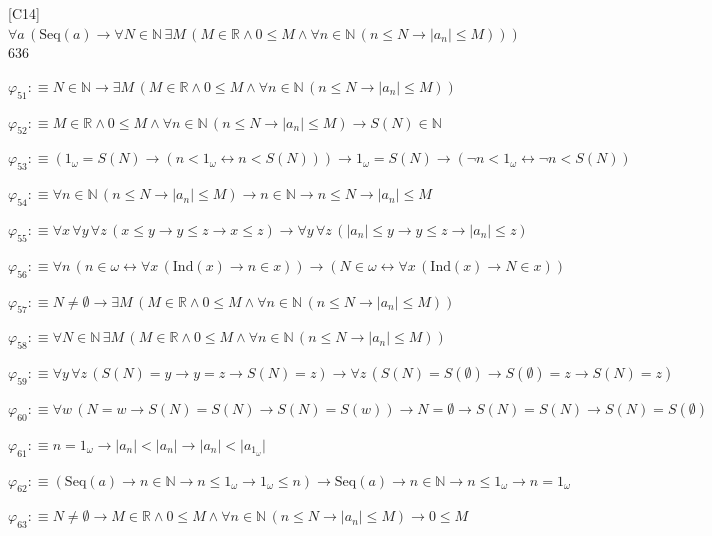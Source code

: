 \begin{fullproof}{[C14]}{$\forall a\,(\mathrm{Seq}(a) \to \forall N \in \mathbb{N}\,\exists M\,(M \in \mathbb{R} \land 0 \leq M \land \forall n \in \mathbb{N}\,(n \leq N \to \lvert a_{n} \rvert \leq M)))$}{636}
\begin{abbrevlist}
\item $\varphi_{51} :\equiv N \in \mathbb{N} \to \exists M\,(M \in \mathbb{R} \land 0 \leq M \land \forall n \in \mathbb{N}\,(n \leq N \to \lvert a_{n} \rvert \leq M))$
\item $\varphi_{52} :\equiv M \in \mathbb{R} \land 0 \leq M \land \forall n \in \mathbb{N}\,(n \leq N \to \lvert a_{n} \rvert \leq M) \to S(N) \in \mathbb{N}$
\item $\varphi_{53} :\equiv (1_{\omega} = S(N) \to (n < 1_{\omega} \leftrightarrow n < S(N))) \to 1_{\omega} = S(N) \to (\neg n < 1_{\omega} \leftrightarrow \neg n < S(N))$
\item $\varphi_{54} :\equiv \forall n \in \mathbb{N}\,(n \leq N \to \lvert a_{n} \rvert \leq M) \to n \in \mathbb{N} \to n \leq N \to \lvert a_{n} \rvert \leq M$
\item $\varphi_{55} :\equiv \forall x\,\forall y\,\forall z\,(x \leq y \to y \leq z \to x \leq z) \to \forall y\,\forall z\,(\lvert a_{n} \rvert \leq y \to y \leq z \to \lvert a_{n} \rvert \leq z)$
\item $\varphi_{56} :\equiv \forall n\,(n \in \omega \leftrightarrow \forall x\,(\mathrm{Ind}(x) \to n \in x)) \to (N \in \omega \leftrightarrow \forall x\,(\mathrm{Ind}(x) \to N \in x))$
\item $\varphi_{57} :\equiv N \neq \emptyset \to \exists M\,(M \in \mathbb{R} \land 0 \leq M \land \forall n \in \mathbb{N}\,(n \leq N \to \lvert a_{n} \rvert \leq M))$
\item $\varphi_{58} :\equiv \forall N \in \mathbb{N}\,\exists M\,(M \in \mathbb{R} \land 0 \leq M \land \forall n \in \mathbb{N}\,(n \leq N \to \lvert a_{n} \rvert \leq M))$
\item $\varphi_{59} :\equiv \forall y\,\forall z\,(S(N) = y \to y = z \to S(N) = z) \to \forall z\,(S(N) = S(\emptyset) \to S(\emptyset) = z \to S(N) = z)$
\item $\varphi_{60} :\equiv \forall w\,(N = w \to S(N) = S(N) \to S(N) = S(w)) \to N = \emptyset \to S(N) = S(N) \to S(N) = S(\emptyset)$
\item $\varphi_{61} :\equiv n = 1_{\omega} \to \lvert a_{n} \rvert < \lvert a_{n} \rvert \to \lvert a_{n} \rvert < \lvert a_{1_{\omega}} \rvert$
\item $\varphi_{62} :\equiv (\mathrm{Seq}(a) \to n \in \mathbb{N} \to n \leq 1_{\omega} \to 1_{\omega} \leq n) \to \mathrm{Seq}(a) \to n \in \mathbb{N} \to n \leq 1_{\omega} \to n = 1_{\omega}$
\item $\varphi_{63} :\equiv N \neq \emptyset \to M \in \mathbb{R} \land 0 \leq M \land \forall n \in \mathbb{N}\,(n \leq N \to \lvert a_{n} \rvert \leq M) \to 0 \leq M$

\end{abbrevlist}
\end{fullproof}
